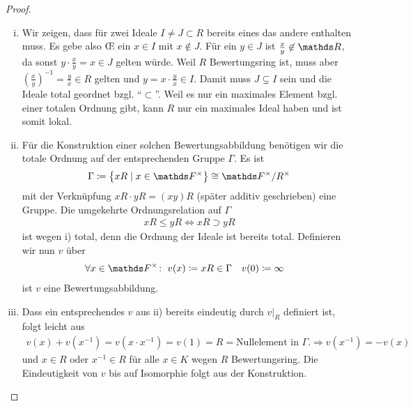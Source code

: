 \documentclass[ngerman,fontsize=11pt, paper=a4, parskip=half, titlepage=true, toc=bib]{scrartcl}
\begin{document}
\begin{Lem}
  \begin{proof}
    \begin{enumerate}[i)]
    \item Wir zeigen, dass für zwei Ideale $I\neq J\subset R$ bereits
      eines das andere enthalten muss. Es gebe also \OE{} ein $x\in I$
      mit $x\not\in J$. Für ein $y\in J$ ist $\frac{x}{y}\not\in\R$,
      da sonst $y\cdot \frac{x}{y}=x\in J$ gelten würde.
      Weil $R$ Bewertungsring ist, muss aber
      $(\frac{x}{y})^{-1}=\frac{y}{x}\in R$ gelten und $y=x\cdot
      \frac{y}{x}\in I$. Damit muss $J\subsetneq I$ sein und die
      Ideale total geordnet bzgl. \enquote{$\subset$}.
      Weil es nur ein maximales Element bzgl. einer totalen Ordnung
      gibt, kann $R$ nur ein maximales Ideal haben und ist somit
      lokal.
    \item Für die Konstruktion einer solchen Bewertungsabbildung
      benötigen wir die totale Ordnung auf der entsprechenden Gruppe $\Gamma$.
      Es ist
      \begin{gather*}
        \Gamma \coloneqq \left\{ xR \mid x\in \Fx \right\}\cong\Fx/R^{\times}
      \end{gather*}
      mit der Verknüpfung $xR\cdot yR=(xy)R$ (später additiv
      geschrieben) eine Gruppe. Die umgekehrte Ordnungsrelation
      auf $\Gamma$
      \begin{gather*}
        xR\leq yR \Longleftrightarrow xR \supset yR
      \end{gather*}
      ist wegen i) total, denn die Ordnung der Ideale ist bereits total.
      Definieren wir nun $v$ über
      \begin{align*}
        \forall x\in \Fx\colon\;v(x)&\coloneqq xR\in\Gamma
        &v(0)&\coloneqq \infty
      \end{align*}
      ist $v$ eine Bewertungsabbildung. 
    \item Dass ein entsprechendes $v$ aus ii) bereits eindeutig
      durch $v|_{R}$ definiert ist, folgt leicht aus
      \begin{gather*}
        v(x)+v(x^{-1}) = v(x\cdot x^{-1}) = v(1) = R  =
        \text{Nullelement in }\Gamma.
        \Longrightarrow v(x^{-1})=-v(x)
      \end{gather*}
      und $x\in R$ oder $x^{-1}\in R$ für alle $x\in K$ wegen $R$
      Bewertungsring.
      Die Eindeutigkeit von $v$ bis auf Isomorphie folgt aus der
      Konstruktion.
    \end{enumerate}
  \end{proof}
\end{Lem}
\end{document}
